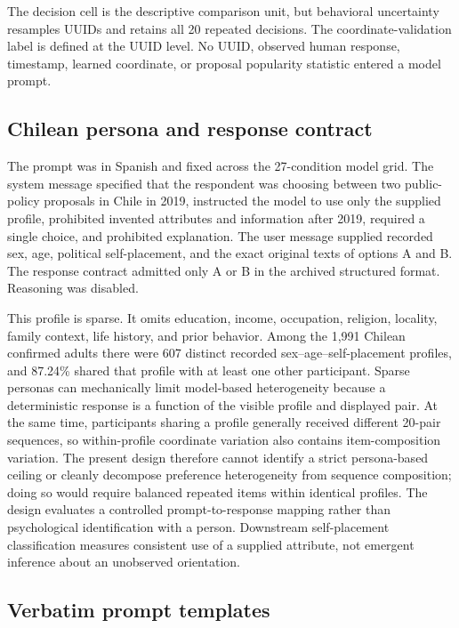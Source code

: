 \documentclass[unnumsec,webpdf,modern,large]{oup-authoring-template}
\begin{document}
The decision cell is the descriptive comparison unit, but behavioral uncertainty resamples UUIDs and retains all 20 repeated decisions. The coordinate-validation label is defined at the UUID level. No UUID, observed human response, timestamp, learned coordinate, or proposal popularity statistic entered a model prompt.

\subsection{Chilean persona and response contract}

The prompt was in Spanish and fixed across the 27-condition model grid. The system message specified that the respondent was choosing between two public-policy proposals in Chile in 2019, instructed the model to use only the supplied profile, prohibited invented attributes and information after 2019, required a single choice, and prohibited explanation. The user message supplied recorded sex, age, political self-placement, and the exact original texts of options A and B. The response contract admitted only A or B in the archived structured format. Reasoning was disabled.

This profile is sparse. It omits education, income, occupation, religion, locality, family context, life history, and prior behavior. Among the 1,991 Chilean confirmed adults there were 607 distinct recorded sex--age--self-placement profiles, and 87.24\% shared that profile with at least one other participant. Sparse personas can mechanically limit model-based heterogeneity because a deterministic response is a function of the visible profile and displayed pair. At the same time, participants sharing a profile generally received different 20-pair sequences, so within-profile coordinate variation also contains item-composition variation. The present design therefore cannot identify a strict persona-based ceiling or cleanly decompose preference heterogeneity from sequence composition; doing so would require balanced repeated items within identical profiles. The design evaluates a controlled prompt-to-response mapping rather than psychological identification with a person. Downstream self-placement classification measures consistent use of a supplied attribute, not emergent inference about an unobserved orientation.

\subsection{Verbatim prompt templates}
\end{document}
